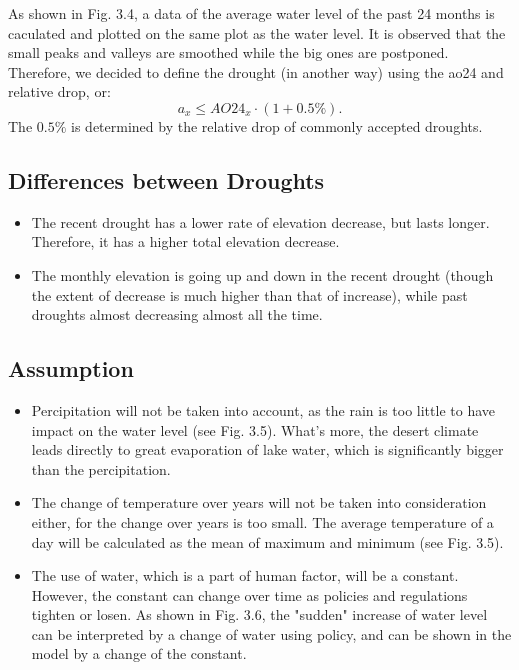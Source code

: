 \documentclass[12pt]{article}
\theoremstyle{definition}
\theoremstyle{remark}
\numberwithin{equation}{section}
\begin{document}
		As shown in Fig. 3.4, a data of the average water level of the past 24 months is caculated and plotted on the same plot 
		as the water level. It is observed that the small peaks and valleys are smoothed while the big ones are postponed. Therefore,
		we decided to define the drought (in another way) using the ao24 and relative drop, or:
		$$
		a_x\leq AO24_x \cdot (1+0.5\%).
		$$
		The $0.5\%$ is determined by the relative drop of commonly accepted droughts.


	\subsection{Differences between Droughts}
		\begin{itemize}
			\item The recent drought has a lower rate of elevation decrease, but lasts longer. Therefore, it has a higher total elevation
			decrease.
			\item The monthly elevation is going up and down in the recent drought (though the extent of decrease is much higher 
			than that of increase), while past droughts almost decreasing almost all the time. 
		\end{itemize}

	\subsection{Assumption}
		\begin{itemize}
			\item Percipitation will not be taken into account, as the rain is too little to have impact on the water level (see Fig. 3.5). What's more, the desert climate leads directly to great evaporation of lake water, which is significantly bigger than the percipitation.
			\item  The change of temperature over years will not be taken into consideration either, for the change over years is too small. The average temperature of a day will be calculated as the mean of maximum and minimum (see Fig. 3.5).
			\item The use of water, which is a part of human factor, will be a constant. However, the constant can change over time as policies and regulations tighten or losen. As shown in Fig. 3.6, the "sudden"  increase of water level can be interpreted by a change of water using policy, and can be shown in the model by a change of the constant.
		\end{itemize}
\end{document}

